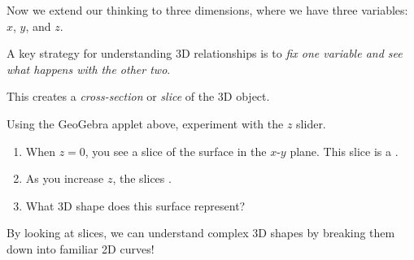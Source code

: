 \documentclass{ximera}
\begin{document}
Now we extend our thinking to three dimensions, where we have three variables: $x$, $y$, and $z$.

\begin{problem}
    A key strategy for understanding 3D relationships is to \emph{fix one variable and see what happens with the other two}.
    
    This creates a \emph{cross-section} or \emph{slice} of the 3D object.
\end{problem}

\begin{center}
\end{center}

\begin{problem}
    Using the GeoGebra applet above, experiment with the $z$ slider.
    
    \begin{enumerate}
        \item When $z = 0$, you see a slice of the surface in the $x$-$y$ plane. This slice is a .
        
        \item As you increase $z$, the slices .
        
        \item What 3D shape does this surface represent?
        \begin{multipleChoice}
        \end{multipleChoice}
    \end{enumerate}
    
    \begin{feedback}
        By looking at slices, we can understand complex 3D shapes by breaking them down into familiar 2D curves!
    \end{feedback}
\end{problem}

\begin{center}
\end{center}
\end{document}

